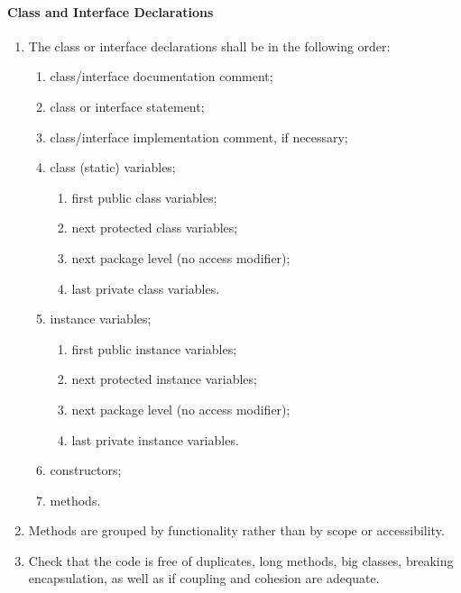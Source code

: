 \paragraph*{Class and Interface Declarations}\begin{enumerate}[resume]
\item The class or interface declarations shall be in the following order:
	\begin{enumerate}
		\item class/interface documentation comment;
		\item class or interface statement;
		\item class/interface implementation comment, if necessary;
		\item class (static) variables;
		\begin{enumerate}
			\item first public class variables;
			\item next protected class variables;
			\item next package level (no access modifier);
			\item last private class variables.
		\end{enumerate}
		\item instance variables;
		\begin{enumerate}
			\item first public instance variables;
			\item next protected instance variables;
			\item next package level (no access modifier);
			\item last private instance variables.
		\end{enumerate}
		\item constructors;
		\item methods.
	\end{enumerate}
	\item Methods are grouped by functionality rather than by scope or accessibility.
	\item Check that the code is free of duplicates, long methods, big classes, breaking encapsulation, as well as if coupling and cohesion are adequate.
\end{enumerate}

